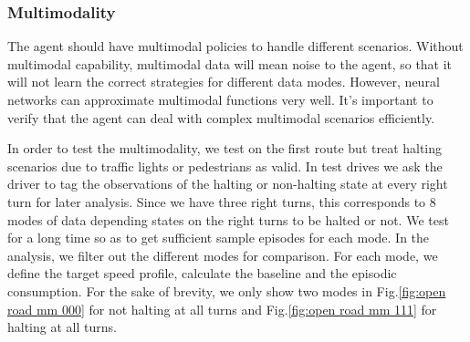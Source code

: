 \documentclass{article}
\begin{document}
\subsubsection{Multimodality}\label{sec:multimodal}

The agent should have multimodal policies to handle different scenarios. Without multimodal capability, multimodal data will mean noise to the agent, so that it will not learn the correct strategies for different data modes.  However, neural networks can approximate multimodal functions very well. It's important to verify that the agent can deal with complex multimodal scenarios efficiently.

In order to test the multimodality, we test on the first route but treat halting scenarios due to traffic lights or pedestrians as valid. In test drives we ask the driver to tag the observations of the halting or non-halting state at every right turn for later analysis. Since we have three right turns, this corresponds to 8 modes of data depending states on the right turns to be halted or not. We test for a long time so as to get sufficient sample episodes for each mode. In the analysis, we filter out the different modes for comparison. For each mode, we define the target speed profile, calculate the baseline and the episodic consumption. For the sake of brevity, we only show two modes in Fig.\@\ref{fig:open road mm 000} for not halting at all turns and Fig.\@\ref{fig:open road mm 111} for halting at all turns.
\end{document}
